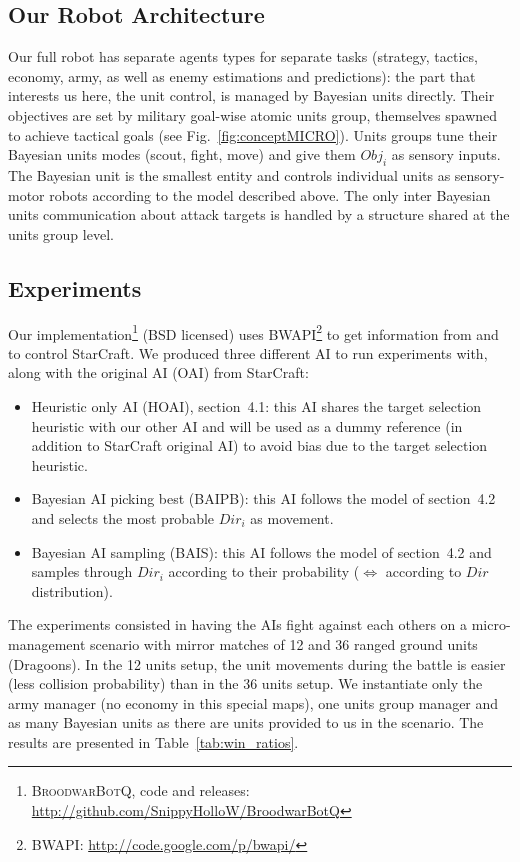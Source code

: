 \subsection{Our Robot Architecture}

Our full robot has separate agents types for separate tasks (strategy, tactics, economy, army, as well as enemy estimations and predictions): the part that interests us here, the unit control, is managed by Bayesian units directly. Their objectives are set by military goal-wise atomic units group, themselves spawned to achieve tactical goals (see Fig.~\ref{fig:conceptMICRO}). Units groups tune their Bayesian units modes (scout, fight, move) and give them $Obj_i$ as sensory inputs. The Bayesian unit is the smallest entity and controls individual units as sensory-motor robots according to the model described above. The only inter Bayesian units communication about attack targets is handled by a structure shared at the units group level.

\subsection{Experiments}

Our implementation\footnote{\textsc{BroodwarBotQ}, code and releases: \url{http://github.com/SnippyHolloW/BroodwarBotQ}} (BSD licensed) uses BWAPI\footnote{BWAPI: \url{http://code.google.com/p/bwapi/}} to get information from and to control StarCraft. 
We produced three different AI to run experiments with, along with the original AI (OAI) from StarCraft:
\begin{itemize}
\item Heuristic only AI (HOAI), section~4.1: this AI shares the target selection heuristic with our other AI and will be used as a dummy reference (in addition to StarCraft original AI) to avoid bias due to the target selection heuristic.
\item Bayesian AI picking best (BAIPB): this AI follows the model of section~4.2 and selects the most probable $Dir_i$ as movement. 
\item Bayesian AI sampling (BAIS): this AI follows the model of section~4.2 and samples through $Dir_i$ according to their probability ($\Leftrightarrow$ according to $Dir$ distribution).
\end{itemize}

The experiments consisted in having the AIs fight against each others on a micro-management scenario with mirror matches of 12 and 36 ranged ground units (Dragoons). In the 12 units setup, the unit movements during the battle is easier (less collision probability) than in the 36 units setup. We instantiate only the army manager (no economy in this special maps), one units group manager and as many Bayesian units as there are units provided to us in the scenario. The results are presented in Table~\ref{tab:win_ratios}.

